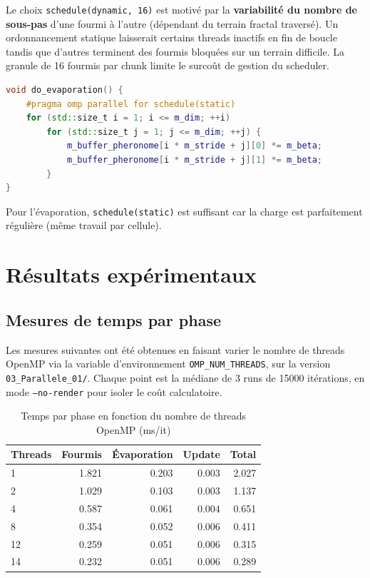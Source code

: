 Le choix \texttt{schedule(dynamic, 16)} est motivé par la \textbf{variabilité du
nombre de sous-pas} d'une fourmi à l'autre (dépendant du terrain fractal traversé).
Un ordonnancement statique laisserait certains threads inactifs en fin de boucle tandis
que d'autres terminent des fourmis bloquées sur un terrain difficile.
La granule de 16 fourmis par chunk limite le surcoût de gestion du scheduler.

\begin{lstlisting}[language=C++, caption={OpenMP sur l'évaporation (pheronome.hpp)}]
void do_evaporation() {
    #pragma omp parallel for schedule(static)
    for (std::size_t i = 1; i <= m_dim; ++i)
        for (std::size_t j = 1; j <= m_dim; ++j) {
            m_buffer_pheronome[i * m_stride + j][0] *= m_beta;
            m_buffer_pheronome[i * m_stride + j][1] *= m_beta;
        }
}
\end{lstlisting}

Pour l'évaporation, \texttt{schedule(static)} est suffisant car la charge est
parfaitement régulière (même travail par cellule).

\section{Résultats expérimentaux}

\subsection{Mesures de temps par phase}

Les mesures suivantes ont été obtenues en faisant varier le nombre de threads OpenMP
via la variable d'environnement \texttt{OMP\_NUM\_THREADS}, sur la version \texttt{03\_Parallele\_01/}.
Chaque point est la médiane de 3 runs de 15000 itérations, en mode \texttt{--no-render}
pour isoler le coût calculatoire.

\begin{table}[h]
\centering
\caption{Temps par phase en fonction du nombre de threads OpenMP (ms/it)}
\label{tab:omp_timing}
\begin{tabular}{lrrrr}
\hline
\textbf{Threads} & \textbf{Fourmis} & \textbf{Évaporation} & \textbf{Update} & \textbf{Total} \\
\hline
1  & 1.821 & 0.203 & 0.003 & 2.027 \\
2  & 1.029 & 0.103 & 0.003 & 1.137 \\
4  & 0.587 & 0.061 & 0.004 & 0.651 \\
8  & 0.354 & 0.052 & 0.006 & 0.411 \\
12 & 0.259 & 0.051 & 0.006 & 0.315 \\
14 & 0.232 & 0.051 & 0.006 & 0.289 \\
\hline
\end{tabular}
\end{table}

